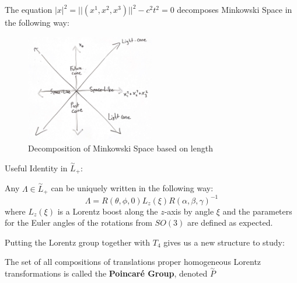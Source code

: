 \documentclass[compress,aspectratio=169,10pt,usenames,dvipsnames]{beamer}
\begin{document}
\begin{frame}
\vfill
The equation $|x|^2 = ||(x^1,x^2,x^3)||^2 - c^2t^2= 0 $ decomposes Minkowski Space in the following way:
\vfill
\begin{figure}[H]
	\centering
	\includegraphics[width=0.5\textwidth]{Light cone-1}
	\caption{Decomposition of Minkowski Space based on length}
\end{figure}
\vfill
\end{frame}
%
%
\begin{frame}
\vfill
Useful Identity in $\overset{\sim}{L}_+$:
\begin{theorem}
	Any $\Lambda \in \overset{\sim}{L}_+$ can be uniquely written in the following way:
$$\Lambda = R(\theta,\phi,0)L_z(\xi)R(\alpha,\beta,\gamma)^{-1}$$
where $L_z(\xi)$ is a Lorentz boost along the $z$-axis by angle $\xi$ and the parameters for the Euler angles of the rotations from $SO(3)$ are defined as expected.
\end{theorem}
\vfill
Putting the Lorentz group together with $T_4$ gives us a new structure to study:
\vfill
\begin{definition}
	The set of all compositions of translations proper homogeneous Lorentz transformations is called the \textbf{Poincar\'e Group}, denoted $\overset{\sim}{P}$
\end{definition}
\end{frame}
\end{document}
